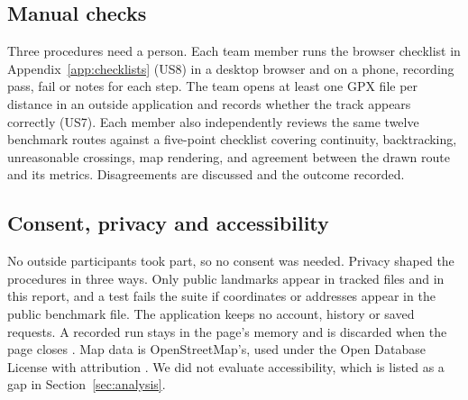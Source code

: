\subsection{Manual checks}
Three procedures need a person. Each team member runs the browser checklist
in Appendix~\ref{app:checklists} (US8) in a desktop browser and on a phone,
recording pass, fail or notes for each step. The team opens at least one GPX
file per distance in an outside application and records whether the track
appears correctly (US7). Each member also independently reviews the same
twelve benchmark routes against a five-point checklist covering continuity,
backtracking, unreasonable crossings, map rendering, and agreement between
the drawn route and its metrics. Disagreements are discussed and the outcome
recorded.

\subsection{Consent, privacy and accessibility}
No outside participants took part, so no consent was needed. Privacy shaped
the procedures in three ways. Only public landmarks appear in tracked files
and in this report, and a test fails the suite if coordinates or addresses
appear in the public benchmark file. The application keeps no account,
history or saved requests. A recorded run stays in the page's memory and is
discarded when the page closes \citep{w3c2026geolocation}. Map data is
OpenStreetMap's, used under the Open Database License with attribution
\citep{osm2026copyright}. We did not evaluate accessibility, which is listed
as a gap in Section~\ref{sec:analysis}.
